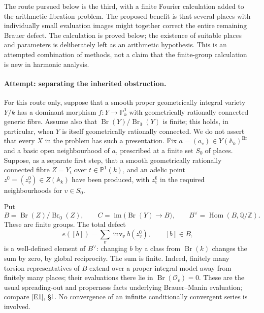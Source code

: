 \documentclass[11pt]{article}
\newcommand{\Z}{\mathbb{Z}}
\newcommand{\Q}{\mathbb{Q}}
\newcommand{\A}{\mathbb{A}}
\newcommand{\PP}{\mathbb P}
\newcommand{\eref}[2]{\hyperlink{extra:#1:#2}{[E#2]}}
\begin{document}
The route pursued below is the third, with a finite Fourier calculation added
to the arithmetic fibration problem.  The proposed benefit is that several
places with individually small evaluation images might together correct the
entire remaining Brauer defect.  The calculation is proved below; the existence
of suitable places and parameters is deliberately left as an arithmetic
hypothesis.  This is an attempted combination of methods, not a claim that
the finite-group calculation is new in harmonic analysis.

\paragraph{Attempt: separating the inherited obstruction.}
For this route only, suppose that a smooth proper geometrically integral variety $Y/k$ has a dominant
morphism $f:Y\to\PP^1_k$ with geometrically rationally connected generic fibre.
Assume also that $\operatorname{Br}(Y)/\operatorname{Br}_0(Y)$ is finite; this
holds, in particular, when $Y$ is itself geometrically rationally connected.
We do not assert that every $X$ in the problem has such a presentation.
Fix $a=(a_v)\in Y(\A_k)^{\operatorname{Br}}$ and a basic open neighbourhood of
$a$, prescribed at a finite set $S_0$ of places.  Suppose, as a separate first
step, that a smooth geometrically rationally connected fibre $Z=Y_t$ over
$t\in\PP^1(k)$, and an adelic point
$z^0=(z_v^0)\in Z(\A_k)$ have been produced, with $z_v^0$ in the required
neighbourhoods for $v\in S_0$.

Put
\[
 B=\operatorname{Br}(Z)/\operatorname{Br}_0(Z),\qquad
 C=\operatorname{im}\bigl(\operatorname{Br}(Y)\longrightarrow B\bigr),
 \qquad B^\vee=\operatorname{Hom}(B,\Q/\Z).
\]
These are finite groups.  The total defect
\begin{equation}\label{ra30003827:defect}
 e([b])=\sum_v\operatorname{inv}_v b(z_v^0),\qquad [b]\in B,
\end{equation}
is a well-defined element of $B^\vee$: changing $b$ by a class from
$\operatorname{Br}(k)$ changes the sum by zero, by global reciprocity.  The
sum is finite.  Indeed, finitely many torsion representatives of $B$ extend
over a proper integral model away from finitely many places; their evaluations
there lie in $\operatorname{Br}(\mathcal O_v)=0$.  These are the usual
spreading-out and properness facts underlying Brauer--Manin evaluation;
compare \eref{30003827}{1}, \S1.  No convergence of an infinite conditionally
convergent series is involved.
\end{document}
